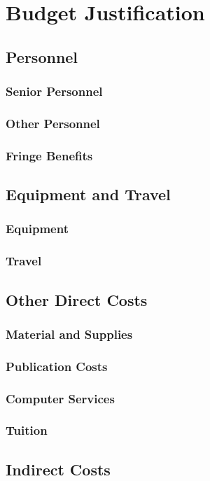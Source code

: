 \chapter{Budget Justification}
\thispagestyle{empty}

\section{Personnel}

\subsection{Senior Personnel}

\subsection{Other Personnel}

\subsection{Fringe Benefits}

\section{Equipment and Travel}

\subsection{Equipment}

\subsection{Travel}

\section{Other Direct Costs}

\subsection{Material and Supplies}

\subsection{Publication Costs}

\subsection{Computer Services}

\subsection{Tuition}

\section{Indirect Costs}
